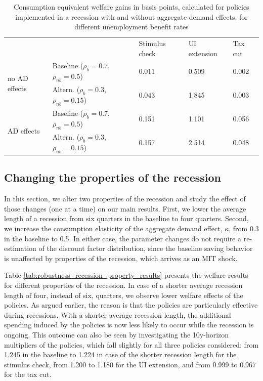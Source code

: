\documentclass[\econtexRoot/HAFiscal]{subfiles}
\begin{document}
\begin{table}[]
  \begin{center}
    \begin{tabular}{@{}lllll@{}}
      \toprule
      &                    & Stimulus check & UI extension & Tax cut \\ \cmidrule(l){1-5} 
      \multirow{2}{*}{no AD effects} 	& Baseline  ($\rho_{b}=0.7$, $\rho_{nb}=0.5$) 		& 0.011          & 0.509        & 0.002   \\
      & Altern.  ($\rho_{b}=0.3$, $\rho_{nb}=0.15$) 	& 0.043          & 1.845        & 0.003   \\ \cmidrule(l){1-5} 
      \multirow{2}{*}{AD effects}		& Baseline  ($\rho_{b}=0.7$, $\rho_{nb}=0.5$)    	& 0.151          & 1.101        & 0.056   \\
      & Altern.  ($\rho_{b}=0.3$, $\rho_{nb}=0.15$)    & 0.157          & 2.514        & 0.048   \\ \cmidrule(l){1-5} 
    \end{tabular}
    \caption{Consumption equivalent welfare gains in basis points, calculated for policies implemented in a recession with and without aggregate demand effects, for different unemployment benefit rates}
    \notinsubfile{\label{tab:robustness_benefit_results}}
  \end{center}
\end{table}




\FloatBarrier
\hypertarget{changing-the-properties-of-the-recession}{}\par\subsection{Changing the properties of the recession}

In this section, we alter two properties of the recession and study the effect of those changes (one at a time) on our main results.
First, we lower the average length of a recession from six quarters in the baseline to four quarters.
Second, we increase the consumption elasticity of the aggregate demand effect, $\kappa$, from 0.3 in the baseline to 0.5.
In either case, the parameter changes do not require a re-estimation of the discount factor distribution, since the baseline saving behavior is unaffected by properties of the recession, which arrives as an MIT shock.


Table \ref{tab:robustness_recession_property_results} presents the welfare results for different properties of the recession.
In case of a shorter average recession length of four, instead of six, quarters, we observe lower welfare effects of the policies.
As argued earlier, the reason is that the policies are particularly effective during recessions.
With a shorter average recession length, the additional spending induced by the policies is now less likely to occur while the recession is ongoing.
This outcome can also be seen by investigating the 10y-horizon multipliers of the policies, which fall slightly for all three policies considered: from 1.245 in the baseline to 1.224 in case of the shorter recession length for the stimulus check, from 1.200 to 1.180 for the UI extension, and from 0.999 to 0.967 for the tax cut.
\end{document}
